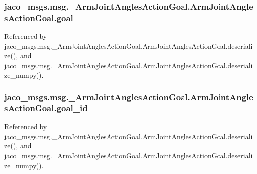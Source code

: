 \subsubsection[{\texorpdfstring{goal}{goal}}]{\setlength{\rightskip}{0pt plus 5cm}jaco\+\_\+msgs.\+msg.\+\_\+\+Arm\+Joint\+Angles\+Action\+Goal.\+Arm\+Joint\+Angles\+Action\+Goal.\+goal}\hypertarget{classjaco__msgs_1_1msg_1_1__ArmJointAnglesActionGoal_1_1ArmJointAnglesActionGoal_ad21a72cdb415ceec3c8f770f97a2f445}{}\label{classjaco__msgs_1_1msg_1_1__ArmJointAnglesActionGoal_1_1ArmJointAnglesActionGoal_ad21a72cdb415ceec3c8f770f97a2f445}


Referenced by jaco\+\_\+msgs.\+msg.\+\_\+\+Arm\+Joint\+Angles\+Action\+Goal.\+Arm\+Joint\+Angles\+Action\+Goal.\+deserialize(), and jaco\+\_\+msgs.\+msg.\+\_\+\+Arm\+Joint\+Angles\+Action\+Goal.\+Arm\+Joint\+Angles\+Action\+Goal.\+deserialize\+\_\+numpy().

\subsubsection[{\texorpdfstring{goal\+\_\+id}{goal_id}}]{\setlength{\rightskip}{0pt plus 5cm}jaco\+\_\+msgs.\+msg.\+\_\+\+Arm\+Joint\+Angles\+Action\+Goal.\+Arm\+Joint\+Angles\+Action\+Goal.\+goal\+\_\+id}\hypertarget{classjaco__msgs_1_1msg_1_1__ArmJointAnglesActionGoal_1_1ArmJointAnglesActionGoal_a7c8303d67ea7eab4c1eb71988d980183}{}\label{classjaco__msgs_1_1msg_1_1__ArmJointAnglesActionGoal_1_1ArmJointAnglesActionGoal_a7c8303d67ea7eab4c1eb71988d980183}


Referenced by jaco\+\_\+msgs.\+msg.\+\_\+\+Arm\+Joint\+Angles\+Action\+Goal.\+Arm\+Joint\+Angles\+Action\+Goal.\+deserialize(), and jaco\+\_\+msgs.\+msg.\+\_\+\+Arm\+Joint\+Angles\+Action\+Goal.\+Arm\+Joint\+Angles\+Action\+Goal.\+deserialize\+\_\+numpy().

